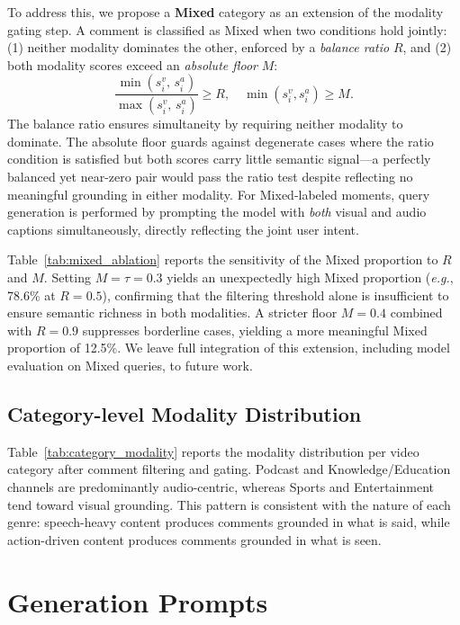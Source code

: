 \documentclass[11pt]{article}
\newcommand{\eg}{\emph{e.g.}}
\begin{document}
To address this, we propose a \textbf{Mixed} category as an extension of the modality gating step.
A comment is classified as Mixed when two conditions hold jointly:
(1) neither modality dominates the other, enforced by a \textit{balance ratio} $R$, and
(2) both modality scores exceed an \textit{absolute floor} $M$:
\begin{equation}
\frac{\min(s_i^v,\,s_i^a)}{\max(s_i^v,\,s_i^a)} \ge R, \quad \min(s_i^v, s_i^a) \ge M.
\end{equation}
The balance ratio ensures simultaneity by requiring neither modality to dominate.
The absolute floor guards against degenerate cases where the ratio condition is satisfied but both scores carry little semantic signal—a perfectly balanced yet near-zero pair would pass the ratio test despite reflecting no meaningful grounding in either modality.
For Mixed-labeled moments, query generation is performed by prompting the model with \textit{both} visual and audio captions simultaneously, directly reflecting the joint user intent.

Table~\ref{tab:mixed_ablation} reports the sensitivity of the Mixed proportion to $R$ and $M$.
Setting $M\!=\!\tau\!=\!0.3$ yields an unexpectedly high Mixed proportion (\eg, 78.6\% at $R\!=\!0.5$), confirming that the filtering threshold alone is insufficient to ensure semantic richness in both modalities.
A stricter floor $M\!=\!0.4$ combined with $R\!=\!0.9$ suppresses borderline cases, yielding a more meaningful Mixed proportion of 12.5\%.
We leave full integration of this extension, including model evaluation on Mixed queries, to future work.


\subsection{Category-level Modality Distribution}     
  Table~\ref{tab:category_modality} reports the modality
   distribution per video category after comment        
  filtering and gating.
  Podcast and Knowledge/Education channels are          
  predominantly audio-centric, whereas Sports and
  Entertainment tend toward visual grounding.
  This pattern is consistent with the nature of each
  genre: speech-heavy content produces comments grounded
   in what is said, while action-driven content produces
   comments grounded in what is seen. 


\section{Generation Prompts}
\label{sec:generation_prompts}
\end{document}
